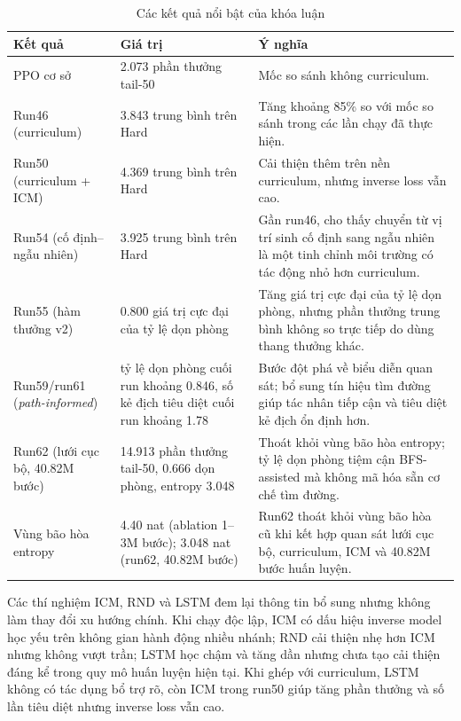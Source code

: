\begin{table}[H]
    \centering
    \small
    \caption{Các kết quả nổi bật của khóa luận}
    \label{tab:conclusion_best_results}
    \begin{tabular}{|p{4.0cm}|p{3.5cm}|p{6.5cm}|}
        \hline
        \textbf{Kết quả} & \textbf{Giá trị} & \textbf{Ý nghĩa} \\
        \hline
        PPO cơ sở & 2.073 phần thưởng tail-50 & Mốc so sánh không curriculum. \\
        \hline
        Run46 (curriculum) & 3.843 trung bình trên Hard & Tăng khoảng 85\% so với mốc so sánh trong các lần chạy đã thực hiện. \\
        \hline
        Run50 (curriculum + ICM) & 4.369 trung bình trên Hard & Cải thiện thêm trên nền curriculum, nhưng inverse loss vẫn cao. \\
        \hline
        Run54 (cố định--ngẫu nhiên) & 3.925 trung bình trên Hard & Gần run46, cho thấy chuyển từ vị trí sinh cố định sang ngẫu nhiên là một tinh chỉnh môi trường có tác động nhỏ hơn curriculum. \\
        \hline
        Run55 (hàm thưởng v2) & 0.800 giá trị cực đại của tỷ lệ dọn phòng & Tăng giá trị cực đại của tỷ lệ dọn phòng, nhưng phần thưởng trung bình không so trực tiếp do dùng thang thưởng khác. \\
        \hline
        Run59/run61 (\emph{path-informed}) & tỷ lệ dọn phòng cuối run khoảng 0.846, số kẻ địch tiêu diệt cuối run khoảng 1.78 & Bước đột phá về biểu diễn quan sát; bổ sung tín hiệu tìm đường giúp tác nhân tiếp cận và tiêu diệt kẻ địch ổn định hơn. \\
        \hline
        Run62 (lưới cục bộ, 40.82M bước) & 14.913 phần thưởng tail-50, 0.666 dọn phòng, entropy 3.048 & Thoát khỏi vùng bão hòa entropy; tỷ lệ dọn phòng tiệm cận BFS-assisted mà không mã hóa sẵn cơ chế tìm đường. \\
        \hline
        Vùng bão hòa entropy & 4.40 nat (ablation 1--3M bước); 3.048 nat (run62, 40.82M bước) & Run62 thoát khỏi vùng bão hòa cũ khi kết hợp quan sát lưới cục bộ, curriculum, ICM và 40.82M bước huấn luyện. \\
        \hline
    \end{tabular}
\end{table}

Các thí nghiệm ICM, RND và LSTM đem lại thông tin bổ sung nhưng không làm thay đổi xu hướng chính. Khi chạy độc lập, ICM có dấu hiệu inverse model học yếu trên không gian hành động nhiều nhánh; RND cải thiện nhẹ hơn ICM nhưng không vượt trần; LSTM học chậm và tăng dần nhưng chưa tạo cải thiện đáng kể trong quy mô huấn luyện hiện tại. Khi ghép với curriculum, LSTM không có tác dụng bổ trợ rõ, còn ICM trong run50 giúp tăng phần thưởng và số lần tiêu diệt nhưng inverse loss vẫn cao.

